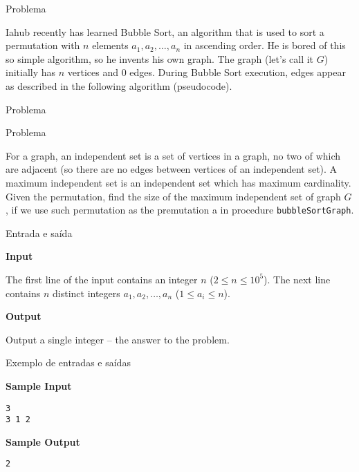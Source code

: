 
\begin{frame}[fragile]{Problema}

Iahub recently has learned Bubble Sort, an algorithm that is used to sort a permutation with 
$n$ elements $a_1, a_2, \ldots, a_n$ in ascending order. He is bored of this so simple 
algorithm, so he invents his own graph. The graph (let's call it $G$) initially has $n$ 
vertices and 0 edges. During Bubble Sort execution, edges appear as described in the following 
algorithm (pseudocode).

\end{frame}

\begin{frame}[fragile]{Problema}
\end{frame}

\begin{frame}[fragile]{Problema}

For a graph, an independent set is a set of vertices in a graph, no two of which are adjacent 
(so there are no edges between vertices of an independent set). A maximum independent set is an 
independent set which has maximum cardinality. Given the permutation, find the size of the 
maximum independent set of graph $G$, if we use such permutation as the premutation a in 
procedure \texttt{bubbleSortGraph}.

\end{frame}

\begin{frame}[fragile]{Entrada e saída}

\textbf{Input}

The first line of the input contains an integer $n$ ($2\leq n\leq 10^5$). The next line 
contains $n$ distinct integers $a_1, a_2, \ldots, a_n$ ($1\leq a_i\leq n$).

\vspace{0.2in}

\textbf{Output}

Output a single integer -- the answer to the problem.

\end{frame}

\begin{frame}[fragile]{Exemplo de entradas e saídas}

\begin{minipage}[t]{0.45\textwidth}
\textbf{Sample Input}
\begin{verbatim}
3
3 1 2
\end{verbatim}
\end{minipage}
\begin{minipage}[t]{0.5\textwidth}
\textbf{Sample Output}
\begin{verbatim}
2
\end{verbatim}
\end{minipage}
\end{frame}

